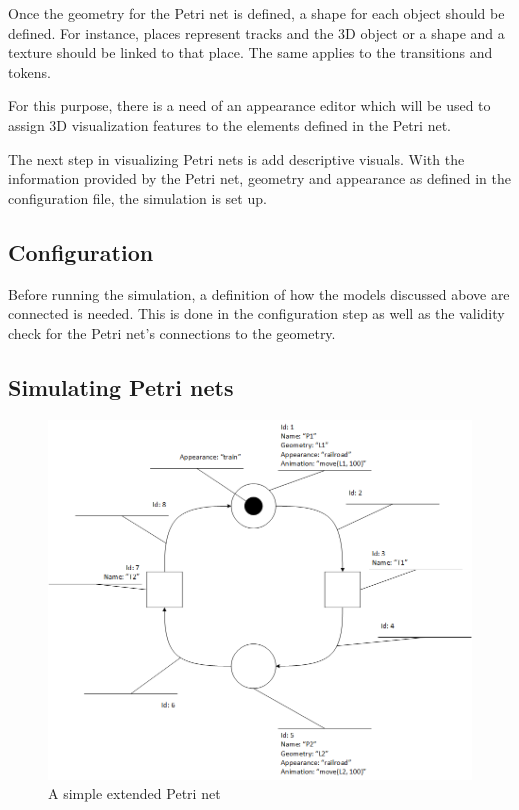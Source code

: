 Once the geometry for the Petri net is defined, a shape for each object should be defined. For instance, places represent tracks and the 3D object or a shape and a texture should be linked to that place. The same applies to the transitions and tokens.

For this purpose, there is a need of an appearance editor which will be used to assign 3D visualization features to the elements defined in the Petri net.

The next step in visualizing Petri nets is add descriptive visuals. With the information provided by the Petri net, geometry and appearance as defined in the configuration file, the simulation is set up.

\subsection{Configuration}

Before running the simulation, a definition of how the models discussed above are connected is needed. This is done in the configuration step as well as the validity check for the Petri net's connections to the geometry. 

\subsection{Simulating Petri nets}

\begin{figure}[htp]
\begin{center}
	\includegraphics[width=\textwidth]{image/example_petrinet.png}
	\caption{A simple extended Petri net}
	\label{fig:example_petrinet}
\end{center}
\end{figure}

